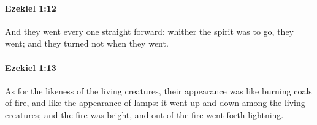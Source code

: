 		\paragraph{Ezekiel 1:12} %
			\label{EZEKIEL-1-12}

			And they went every one straight forward: whither the spirit was to go, they went; and they turned not when they went.


		\paragraph{Ezekiel 1:13} %
			\label{EZEKIEL-1-13}

			As for the likeness of the living creatures, their appearance was like burning coals of fire, and like the appearance of lamps: it went up and down among the living creatures; and the fire was bright, and out of the fire went forth lightning.



